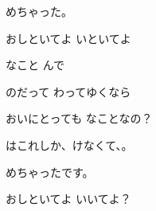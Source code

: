\documentclass[a4paper,tate,twocolumn,12pt]{ltjtarticle}
\begin{document}
\begin{flushleft}
\begin{minipage}{\linewidth}
めちゃった。

おしといてよ いといてよ
\end{minipage}

\vspace{2em}

\noindent\begin{minipage}{\linewidth}
なこと んで

のだって わってゆくなら

おいにとっても なことなの？

はこれしか、けなくて、。

めちゃったです。

おしといてよ いいてよ？
\end{minipage}

\end{flushleft}
\end{document}
